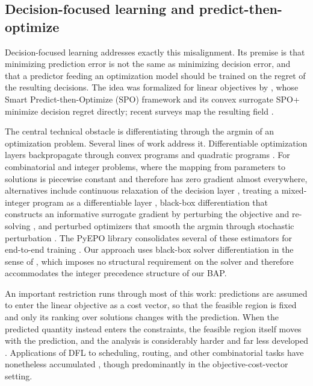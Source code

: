 \subsection{Decision-focused learning and predict-then-optimize}\label{sec:related-dfl}

Decision-focused learning addresses exactly this misalignment. Its premise is that minimizing prediction error is not the same as minimizing decision error, and that a predictor feeding an optimization model should be trained on the regret of the resulting decisions. The idea was formalized for linear objectives by \citet{elmachtoub2022spo}, whose Smart Predict-then-Optimize (SPO) framework and its convex surrogate SPO+ minimize decision regret directly; recent surveys map the resulting field \citep{mandi2024decision, kotary2021end, sadana2025survey}.

The central technical obstacle is differentiating through the argmin of an optimization problem. Several lines of work address it. Differentiable optimization layers backpropagate through convex programs and quadratic programs \citep{amos2017optnet, agrawal2019differentiable}. For combinatorial and integer problems, where the mapping from parameters to solutions is piecewise constant and therefore has zero gradient almost everywhere, alternatives include continuous relaxation of the decision layer \citep{wilder2019melding}, treating a mixed-integer program as a differentiable layer \citep{ferber2020mipaal}, black-box differentiation that constructs an informative surrogate gradient by perturbing the objective and re-solving \citep{pogancic2020blackbox}, and perturbed optimizers that smooth the argmin through stochastic perturbation \citep{berthet2020learning}. The PyEPO library consolidates several of these estimators for end-to-end training \citep{tang2024pyepo}. Our approach uses black-box solver differentiation in the sense of \citet{pogancic2020blackbox}, which imposes no structural requirement on the solver and therefore accommodates the integer precedence structure of our BAP.

An important restriction runs through most of this work: predictions are assumed to enter the linear objective as a cost vector, so that the feasible region is fixed and only its ranking over solutions changes with the prediction. When the predicted quantity instead enters the constraints, the feasible region itself moves with the prediction, and the analysis is considerably harder and far less developed \citep{hu2023twostage, mandi2025feasibility}. Applications of DFL to scheduling, routing, and other combinatorial tasks have nonetheless accumulated \citep{mandi2020smart, shi2023decision, wilder2019melding}, though predominantly in the objective-cost-vector setting.

